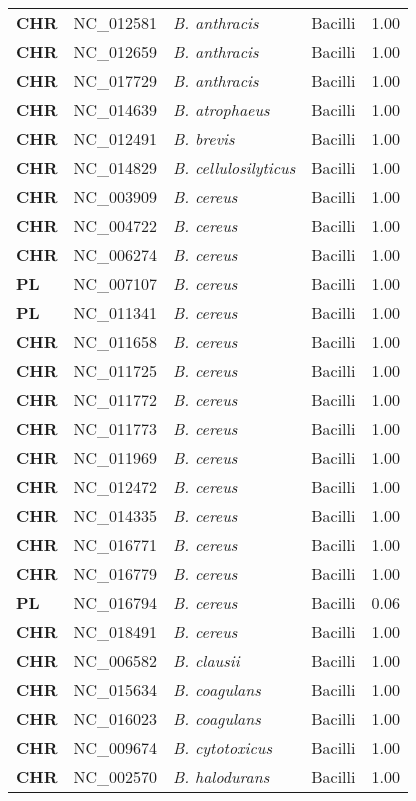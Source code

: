 \begin{adjustwidth}{-3cm}{2cm}
{\begin{supertabular}{>{\bfseries}l|p{0.1\textwidth}p{0.14\textwidth}l|l}
CHR & NC\_012581 & \textit{B. anthracis} & Bacilli & 1.00\\
CHR & NC\_012659 & \textit{B. anthracis} & Bacilli & 1.00\\
CHR & NC\_017729 & \textit{B. anthracis} & Bacilli & 1.00\\
CHR & NC\_014639 & \textit{B. atrophaeus} & Bacilli & 1.00\\
CHR & NC\_012491 & \textit{B. brevis} & Bacilli & 1.00\\
CHR & NC\_014829 & \textit{B. cellulosilyticus} & Bacilli & 1.00\\
CHR & NC\_003909 & \textit{B. cereus} & Bacilli & 1.00\\
CHR & NC\_004722 & \textit{B. cereus} & Bacilli & 1.00\\
CHR & NC\_006274 & \textit{B. cereus} & Bacilli & 1.00\\
PL & NC\_007107 & \textit{B. cereus} & Bacilli & 1.00\\
PL & NC\_011341 & \textit{B. cereus} & Bacilli & 1.00\\
CHR & NC\_011658 & \textit{B. cereus} & Bacilli & 1.00\\
CHR & NC\_011725 & \textit{B. cereus} & Bacilli & 1.00\\
CHR & NC\_011772 & \textit{B. cereus} & Bacilli & 1.00\\
CHR & NC\_011773 & \textit{B. cereus} & Bacilli & 1.00\\
CHR & NC\_011969 & \textit{B. cereus} & Bacilli & 1.00\\
CHR & NC\_012472 & \textit{B. cereus} & Bacilli & 1.00\\
CHR & NC\_014335 & \textit{B. cereus} & Bacilli & 1.00\\
CHR & NC\_016771 & \textit{B. cereus} & Bacilli & 1.00\\
CHR & NC\_016779 & \textit{B. cereus} & Bacilli & 1.00\\
PL & NC\_016794 & \textit{B. cereus} & Bacilli & 0.06\\
CHR & NC\_018491 & \textit{B. cereus} & Bacilli & 1.00\\
CHR & NC\_006582 & \textit{B. clausii} & Bacilli & 1.00\\
CHR & NC\_015634 & \textit{B. coagulans} & Bacilli & 1.00\\
CHR & NC\_016023 & \textit{B. coagulans} & Bacilli & 1.00\\
CHR & NC\_009674 & \textit{B. cytotoxicus} & Bacilli & 1.00\\
CHR & NC\_002570 & \textit{B. halodurans} & Bacilli & 1.00\\

\end{supertabular}}
\end{adjustwidth}
